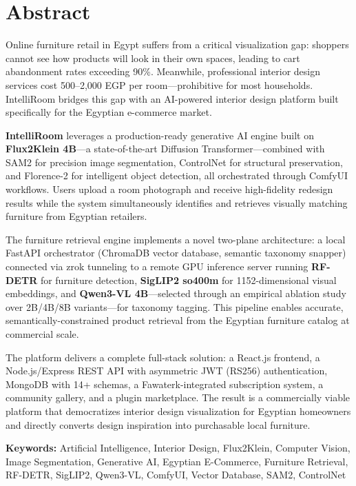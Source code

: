 
\chapter*{Abstract}

\vspace{1cm}

Online furniture retail in Egypt suffers from a critical visualization gap: shoppers cannot see how products will look in their own spaces, leading to cart abandonment rates exceeding 90\%. Meanwhile, professional interior design services cost 500--2,000 EGP per room---prohibitive for most households. IntelliRoom bridges this gap with an AI-powered interior design platform built specifically for the Egyptian e-commerce market.

\vspace{0.5cm}

\textbf{IntelliRoom} leverages a production-ready generative AI engine built on \textbf{Flux2Klein 4B}---a state-of-the-art Diffusion Transformer---combined with SAM2 for precision image segmentation, ControlNet for structural preservation, and Florence-2 for intelligent object detection, all orchestrated through ComfyUI workflows. Users upload a room photograph and receive high-fidelity redesign results while the system simultaneously identifies and retrieves visually matching furniture from Egyptian retailers.

\vspace{0.5cm}

The furniture retrieval engine implements a novel two-plane architecture: a local FastAPI orchestrator (ChromaDB vector database, semantic taxonomy snapper) connected via zrok tunneling to a remote GPU inference server running \textbf{RF-DETR} for furniture detection, \textbf{SigLIP2 so400m} for 1152-dimensional visual embeddings, and \textbf{Qwen3-VL 4B}---selected through an empirical ablation study over 2B/4B/8B variants---for taxonomy tagging. This pipeline enables accurate, semantically-constrained product retrieval from the Egyptian furniture catalog at commercial scale.

\vspace{0.5cm}

The platform delivers a complete full-stack solution: a React.js frontend, a Node.js/Express REST API with asymmetric JWT (RS256) authentication, MongoDB with 14+ schemas, a Fawaterk-integrated subscription system, a community gallery, and a plugin marketplace. The result is a commercially viable platform that democratizes interior design visualization for Egyptian homeowners and directly converts design inspiration into purchasable local furniture.

\vspace{1cm}

\textbf{Keywords:} Artificial Intelligence, Interior Design, Flux2Klein, Computer Vision, Image Segmentation, Generative AI, Egyptian E-Commerce, Furniture Retrieval, RF-DETR, SigLIP2, Qwen3-VL, ComfyUI, Vector Database, SAM2, ControlNet

